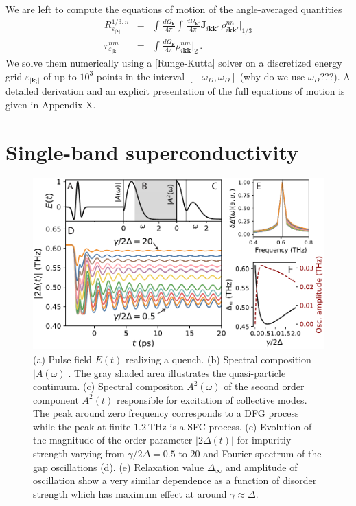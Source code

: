 \documentclass[aps,prb,reprint,noeprint,superscriptaddress]{revtex4-1}
\begin{document}
We are left to compute the equations of motion of the
angle-averaged quantities
\begin{eqnarray*}
  R^{1/3,n}_{\varepsilon_{|\mathbf{k}|}} &=& 
  \int_{}^{}\frac{d\Omega_{\mathbf{k}}}{4\pi}
  \int_{}^{}\frac{d\Omega_{\mathbf{k'}}}{4\pi}
  \mathbf{J}_{i\mathbf{kk'}} \, \rho_{i\mathbf{kk'}}^{nn}\big|_{1/3}
  \\
  r^{nm}_{\varepsilon_{|\mathbf{k}|}} &=& 
  \int_{}^{}\frac{d\Omega_{\mathbf{k}}}{4\pi}
  \rho_{i\mathbf{kk}}^{nm}\big|_{2} \,.
\end{eqnarray*}
We solve them numerically using a [Runge-Kutta] solver on a discretized energy grid
$\varepsilon_{|\mathbf{k}_i|}$ of up to $10^3$ points in the interval $\left[
  -\omega_D, \omega_D
\right]$ (why do we use $\omega_D$???).
A detailed derivation and an explicit presentation of the full equations of
motion is given in Appendix X.









\section{Single-band superconductivity}

\begin{figure}[ht]
	\centering
	\includegraphics[width=\columnwidth]{figures/fig1.pdf}
	\caption{(a) Pulse field $E(t)$ realizing a quench. (b) Spectral
	composition $|A(\omega)|$. The gray shaded area illustrates the
quasi-particle continuum. (c) Spectral compositon $A^2(\omega)$ of the second
order component $A^2(t)$ responsible for excitation of collective modes. The
peak around zero frequency corresponds to a DFG process while the peak at finite
$\SI{1.2}{\tera\hertz}$ is a SFC process. (c) Evolution of the magnitude of the
order parameter $\left|2\Delta(t)\right|$ for impuritiy strength varying from
$\gamma/2\Delta=0.5$ to $20$ and Fourier spectrum of the gap oscillations (d).
(e) Relaxation value $\Delta_{\infty}$ and amplitude of oscillation show a very
similar dependence as a function of disorder strength which has maximum effect
at around $\gamma \approx \Delta$.}
\label{fig:singleband-gap}
\end{figure}
\label{sec:singleband}
\end{document}
